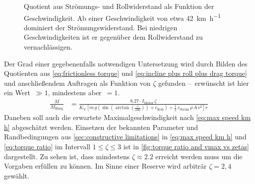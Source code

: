 		\begin{figure}[h]
			\centering
			
			\caption[Quotient aus Strömungs- und Rollwiderstand als Funktion der Geschwindigkeit]{Quotient aus Strömungs- und Rollwiderstand als Funktion der Geschwindigkeit. Ab einer Geschwindigkeit von etwa \qty{42}{\kilo\metre\per\hour} dominiert der Strömungswiderstand. Bei niedrigen Geschwindigkeiten ist er gegenüber dem Rollwiderstand zu vernachlässigen.}%
			\label{fig:Froll vs Fdrag}
		\end{figure}
		Der Grad einer gegebenenfalls notwendigen Untersetzung wird durch Bilden des Quotienten aus \cref{eq:frictionless torque} und \cref{eq:incline plus roll plus drag torque} und anschließendem Auftragen als Funktion von \(\zeta\) gefunden --~erwünscht ist hier ein Wert~\(\gg 1\), mindestens aber~\(= 1\).
		\begin{align}
			\frac{M}{M_\text{Hang}} &= \frac{\num{8,27} \cdot I_\text{Motor} \, \zeta}{K_\text{V}
			\left[ m \, g
				\left(\sin\!
					\left(\arctan\!
						\left(
							\frac{\angle}{100}
						\right)
					\right) + c_\text{Roll}
				\right) + \frac{1}{2} \, c_\text{Ström} \, \rho \, A \, v^2
			\right] r}%
			\label{eq:torque ratio}
		\end{align}
		Daneben soll auch die erwartete Maximalgeschwindigkeit nach \cref{eq:max speed km h} abgeschätzt werden.
		Einsetzen der bekannten Parameter und Randbedingungen aus \cref{sec:constructive limitations} in \cref{eq:max speed km h} und \cref{eq:torque ratio} im Intervall \(1 \leq \zeta \leq 3\) ist in \cref{fig:torque ratio and vmax vs zetas} dargestellt.
		Zu sehen ist, dass mindestens \(\zeta \approx \num{2,2}\) erreicht werden muss um die Vorgaben erfüllen zu können.
		Im Sinne einer Reserve wird arbiträr \(\zeta = 2,4\) gewählt.
